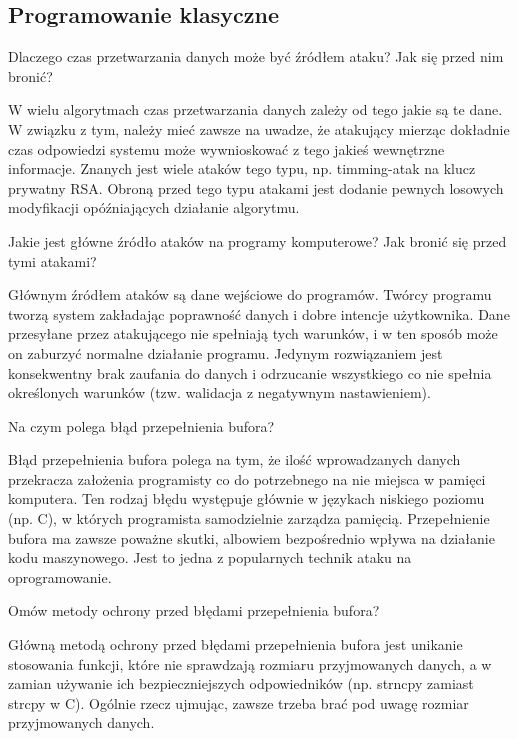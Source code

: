 \documentclass[answers,11pt]{exam}
\begin{document}
\subsection{Programowanie klasyczne}
\begin{questions}

\question Dlaczego czas przetwarzania danych może być źródłem ataku? Jak się przed nim bronić?
\begin{solution}
W wielu algorytmach czas przetwarzania danych zależy od tego jakie są te dane. W związku z tym, należy mieć zawsze na uwadze, że atakujący mierząc dokładnie czas odpowiedzi systemu może wywnioskować z tego jakieś wewnętrzne informacje. Znanych jest wiele ataków tego typu, np. timming-atak na klucz prywatny RSA.
Obroną przed tego typu atakami jest dodanie pewnych losowych modyfikacji opóźniających działanie algorytmu.  
\end{solution}

\question Jakie jest główne źródło ataków na programy komputerowe? Jak bronić się przed tymi atakami?
\begin{solution}
Głównym źródłem ataków są dane wejściowe do programów. Twórcy programu tworzą system zakładając poprawność danych i dobre intencje użytkownika. Dane przesyłane przez atakującego nie spełniają tych warunków, i w ten sposób może on zaburzyć normalne działanie programu. 
Jedynym rozwiązaniem jest konsekwentny brak zaufania do danych i odrzucanie wszystkiego co nie spełnia określonych warunków (tzw. walidacja z negatywnym nastawieniem).
\end{solution}


\question Na czym polega błąd przepełnienia bufora?
\begin{solution}
Błąd przepełnienia bufora polega na tym, że ilość wprowadzanych danych przekracza założenia programisty co do potrzebnego na nie miejsca w pamięci komputera. Ten rodzaj błędu występuje głównie w językach niskiego poziomu (np. C), w których programista samodzielnie zarządza pamięcią. Przepełnienie bufora ma zawsze poważne skutki, albowiem bezpośrednio wpływa na działanie kodu maszynowego. Jest to jedna z popularnych technik ataku na oprogramowanie. 
\end{solution}

\question Omów metody ochrony przed błędami przepełnienia bufora?
\begin{solution}
Główną metodą ochrony przed błędami przepełnienia bufora jest unikanie stosowania funkcji, które nie sprawdzają rozmiaru przyjmowanych danych, a w zamian używanie ich bezpieczniejszych odpowiedników (np. strncpy zamiast strcpy w C). Ogólnie rzecz ujmując, zawsze trzeba brać pod uwagę rozmiar przyjmowanych danych.
\end{solution}


\end{questions}
\end{document}

